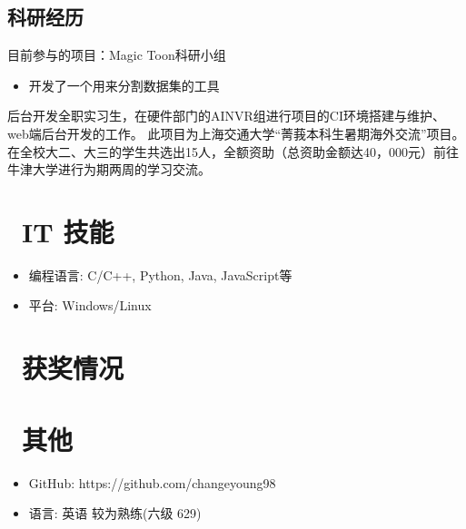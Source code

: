 \documentclass{resume}
\begin{document}
\subsection{\textbf{科研经历}}
目前参与的项目：Magic Toon科研小组
\begin{itemize}
  \item 开发了一个用来分割数据集的工具
\end{itemize}
后台开发全职实习生，在硬件部门的AINVR组进行项目的CI环境搭建与维护、web端后台开发的工作。
此项目为上海交通大学“菁莪本科生暑期海外交流”项目。在全校大二、大三的学生共选出15人，全额资助（总资助金额达40，000元）前往牛津大学进行为期两周的学习交流。



\section{\faCogs\ IT 技能}
\begin{itemize}[parsep=0.5ex]
  \item 编程语言: C/C++, Python, Java, JavaScript等
  \item 平台: Windows/Linux
\end{itemize}

\section{\faHeartO\ 获奖情况}

\section{\faInfo\ 其他}
\begin{itemize}[parsep=0.5ex]
  \item GitHub: https://github.com/changeyoung98
  \item 语言: 英语 较为熟练(六级 629)
\end{itemize}

%
%
\end{document}
